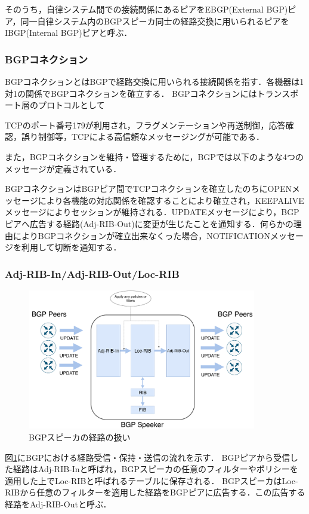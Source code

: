 そのうち，自律システム間での接続関係にあるピアをEBGP(External BGP)ピア，同一自律システム内のBGPスピーカ同士の経路交換に用いられるピアをIBGP(Internal BGP)ピアと呼ぶ．

\subsubsection{BGPコネクション}
BGPコネクションとはBGPで経路交換に用いられる接続関係を指す．各機器は1対1の関係でBGPコネクションを確立する．
BGPコネクションにはトランスポート層のプロトコルとして{TCP\cite{RFC793}のポート番号179が利用され，フラグメンテーションや再送制御，応答確認，誤り制御等，TCPによる高信頼なメッセージングが可能である．

また，BGPコネクションを維持・管理するために，BGPでは以下のような4つのメッセージが定義されている．

BGPコネクションはBGPピア間でTCPコネクションを確立したのちにOPENメッセージにより各機能の対応関係を確認することにより確立され，KEEPALIVEメッセージによりセッションが維持される．UPDATEメッセージにより，BGPピアへ広告する経路(Adj-RIB-Out)に変更が生じたことを通知する．何らかの理由によりBGPコネクションが確立出来なくった場合，NOTIFICATIONメッセージを利用して切断を通知する．

\subsubsection{Adj-RIB-In/Adj-RIB-Out/Loc-RIB}
\begin{figure}[h]
    \begin{center}
    \includegraphics[width=10cm,pagebox=cropbox,clip]{img/bgp-rib-model.pdf}
    \end{center}
    \caption{BGPスピーカの経路の扱い}
    \label{fig:bgp-rib-model}
\end{figure}
図\ref{fig:bgp-rib-model}にBGPにおける経路受信・保持・送信の流れを示す．
BGPピアから受信した経路はAdj-RIB-Inと呼ばれ，BGPスピーカの任意のフィルターやポリシーを適用した上でLoc-RIBと呼ばれるテーブルに保存される．
BGPスピーカはLoc-RIBから任意のフィルターを適用した経路をBGPピアに広告する．この広告する経路をAdj-RIB-Outと呼ぶ．




}
